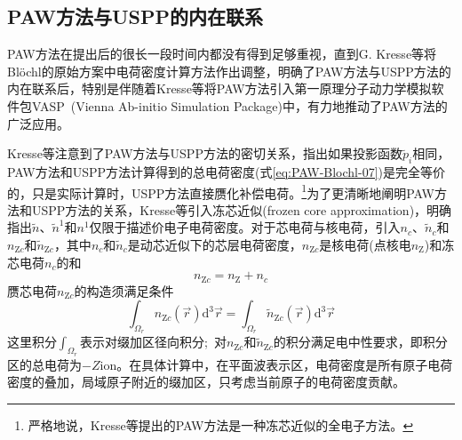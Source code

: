 \subsection{PAW方法与USPP的内在联系}
%
\textrm{PAW}方法在提出后的很长一段时间内都没有得到足够重视，直到\textrm{G. Kresse}等将\textrm{Bl\"ochl}的原始方案中电荷密度计算方法作出调整，明确了\textrm{PAW}方法与\textrm{USPP}方法的内在联系后，特别是伴随着\textrm{Kresse}等将\textrm{PAW}方法引入第一原理分子动力学模拟软件包\textrm{VASP~(Vienna Ab-initio Simulation Package)}中，有力地推动了\textrm{PAW}方法的广泛应用。

\textrm{Kresse}等注意到了\textrm{PAW}方法与\textrm{USPP}方法的密切关系，指出如果投影函数$\tilde p_i$相同，\textrm{PAW}方法和\textrm{USPP}方法计算得到的总电荷密度(式\eqref{eq:PAW-Blochl-07})是完全等价的，只是实际计算时，\textrm{USPP}方法直接赝化补偿电荷。\footnote{严格地说，\textrm{Kresse}等提出的\textrm{PAW}方法是一种冻芯近似的全电子方法。}为了更清晰地阐明\textrm{PAW}方法和\textrm{USPP}方法的关系，\textrm{Kresse}等引入冻芯近似(\textrm{frozen core approximation})，明确指出$\tilde n$、$\tilde n^1$和$n^1$仅限于描述价电子电荷密度。对于芯电荷与核电荷，引入$n_c$、$\tilde n_c$和$n_{\mathrm{Z}c}$和$\tilde n_{\mathrm{Z}c}$，其中$n_c$和$\tilde n_c$是动芯近似下的芯层电荷密度，$n_{\mathrm{Z}c}$是核电荷(点核电$n_{\mathrm Z}$)和冻芯电荷$n_c$的和
\begin{displaymath}
	n_{\mathrm{Z}c}=n_{\mathrm{Z}}+n_c
\end{displaymath}
赝芯电荷$n_{\mathrm{Z}c}$的构造须满足条件
\begin{equation}
	\int_{\Omega_r}n_{\mathrm{Z}c}(\vec r)\mathrm{d}^3\vec r=\int_{\Omega_r}\tilde n_{\mathrm{Z}c}(\vec r)\mathrm{d}^3\vec r
	\label{eq:PAW_Kresse_01}
\end{equation}
这里积分$\int_{\Omega_r}$表示对缀加区径向积分;~对$n_{\mathrm{Z}c}$和$\tilde n_{\mathrm{Z}c}$的积分满足电中性要求，即积分区的总电荷为$-Z{\mathrm{ion}}$。在具体计算中，在平面波表示区，电荷密度是所有原子电荷密度的叠加，局域原子附近的缀加区，只考虑当前原子的电荷密度贡献。


